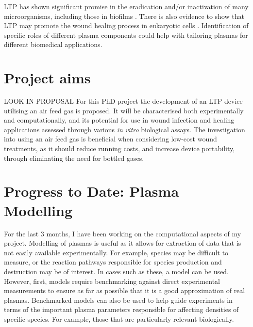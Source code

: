 \documentclass[11pt, oneside]{article}   	%
\begin{document}
LTP has shown significant promise in the eradication and/or inactivation of many microorganisms, including those in biofilms \cite{Laroussi2005low}. 
There is also evidence to show that LTP may promote the wound healing process in eukaryotic cells \cite{Haertel2014nonthermal, Kramer2013suitability}.
Identification of specific roles of different plasma components could help with tailoring plasmas for different biomedical applications.

\section{Project aims}
LOOK IN PROPOSAL
For this PhD project the development of an LTP device utilising an air feed gas is proposed.
It will be characterised both experimentally and computationally, and its potential for use in wound infection and healing applications assessed through various \textit{in vitro} biological assays.
The investigation into using an air feed gas is beneficial when considering low-cost wound treatments, as it should reduce running costs, and increase device portability, through eliminating the need for bottled gases.

\section{Progress to Date: Plasma Modelling}
For the last 3 months, I have been working on the computational aspects of my project.
Modelling of plasmas is useful as it allows for extraction of data that is not easily available experimentally. 
For example, species may be difficult to measure, or the reaction pathways responsible for species production and destruction may be of interest.
In cases such as these, a model can be used.
However, first, models require benchmarking against direct experimental measurements to ensure as far as possible that it is a good approximation of real plasmas.
Benchmarked models can also be used to help guide experiments in terms of the important plasma parameters responsible for affecting densities of specific species. 
For example, those that are particularly relevant biologically.
\end{document}

